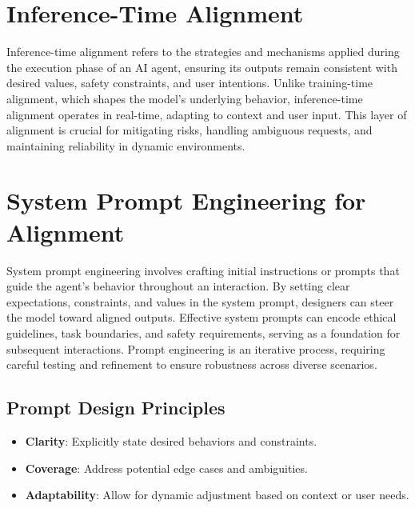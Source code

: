 
\begin{TNtwocol}

\section{Inference-Time Alignment}
Inference-time alignment refers to the strategies and mechanisms applied during the execution phase of an AI agent, ensuring its outputs remain consistent with desired values, safety constraints, and user intentions. Unlike training-time alignment, which shapes the model’s underlying behavior, inference-time alignment operates in real-time, adapting to context and user input. This layer of alignment is crucial for mitigating risks, handling ambiguous requests, and maintaining reliability in dynamic environments.

\section{System Prompt Engineering for Alignment}
System prompt engineering involves crafting initial instructions or prompts that guide the agent’s behavior throughout an interaction. By setting clear expectations, constraints, and values in the system prompt, designers can steer the model toward aligned outputs. Effective system prompts can encode ethical guidelines, task boundaries, and safety requirements, serving as a foundation for subsequent interactions. Prompt engineering is an iterative process, requiring careful testing and refinement to ensure robustness across diverse scenarios.

\subsection{Prompt Design Principles}
\begin{itemize}
    \item \textbf{Clarity}: Explicitly state desired behaviors and constraints.
    \item \textbf{Coverage}: Address potential edge cases and ambiguities.
    \item \textbf{Adaptability}: Allow for dynamic adjustment based on context or user needs.
\end{itemize}


\end{TNtwocol}
